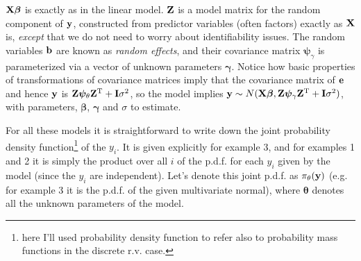 \documentclass[10pt] {article}
\newcommand{\bp}{{\vm \beta}}
\newcommand{\X}{{\vf X}}
\newcommand{\vf}{\bf} %
\newcommand{\vm}{\bm} %
\newcommand{\ts}{^{\rm T}}
\theoremstyle{definition}
\begin{document}
\begin{enumerate}
${\bf X}\bp$ is exactly as in the linear model. ${\bf Z}$ is a model matrix for the random component of $\bf y$, constructed from predictor variables (often factors) exactly as $\bf X$ is, {\em except} that we do not need to worry about identifiability issues. The random variables $\bf b$ are known as {\em random effects}, and their covariance matrix ${\bm \psi}_{\gamma}$ is parameterized via a vector of unknown parameters $\bm \gamma$. Notice how basic properties of transformations of covariance matrices imply that the covariance matrix of $\bf e$ and hence ${\bf y}$ is ${\bf Z}{\bm \psi}_{\theta}{\bf Z}\ts + {\bf I} \sigma^2$, so the model implies ${\bf y} \sim N(\X \bp,{\bf Z}{\bm \psi}_{\gamma}{\bf Z}\ts + {\bf I} \sigma^2)$, with parameters, $\bp$, $\bm \gamma$ and $\sigma$ to estimate.
\end{enumerate}  
For all these models it is straightforward to write down the joint probability density function\footnote{here I'll used probability density function to refer also to probability mass functions in the discrete r.v. case.} of the $y_i$. It is given explicitly for example 3, and for examples 1 and 2 it is simply the product over all $i$ of the p.d.f. for each $y_i$ given by the model (since the $y_i$ are independent). Let's denote this joint p.d.f. as $\pi_\theta({\bf y})$ (e.g. for example 3 it is the p.d.f. of the given multivariate normal), where $\bm \theta$ denotes all the unknown parameters of the model. 
\end{document}
